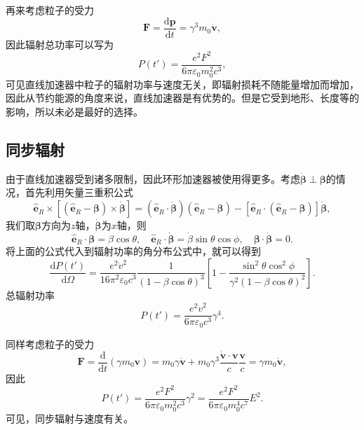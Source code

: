\documentclass[UTF8]{ctexbook}
\renewcommand{\d}{\mathrm{d}}
\renewcommand{\b}{\boldsymbol}
\numberwithin{equation}{chapter}
\begin{document}
	再来考虑粒子的受力
	\[\b{F}=\frac{\d \b{p}}{\d t}=\gamma^3 m_0 \dot{\b{v}},\]
	因此辐射总功率可以写为
	\[P(t')=\frac{e^2 F^2}{6\pi\varepsilon_0 m_0^2 c^3},\]
	可见直线加速器中粒子的辐射功率与速度无关，即辐射损耗不随能量增加而增加，因此从节约能源的角度来说，直线加速器是有优势的。但是它受到地形、长度等的影响，所以未必是最好的选择。
	
	\subsection{同步辐射}
	
	由于直线加速器受到诸多限制，因此环形加速器被使用得更多。考虑$\dot{\b{\beta}}\perp \b{\beta}$的情况，首先利用矢量三重积公式
	\[\hat{\b{e}}_R\times[(\hat{\b{e}}_R-\b{\beta})\times\dot{\b{\beta}}]=(\hat{\b{e}}_R\cdot\dot{\b{\beta}})(\hat{\b{e}}_R-\b{\beta})-[\hat{\b{e}}_R\cdot(\hat{\b{e}}_R-\b{\beta})]\dot{\b{\beta}},\]
	我们取$\b{\beta}$方向为$z$轴，$\dot{\b{\beta}}$为$x$轴，则
	\[\hat{\b{e}}_R\cdot\b{\beta}=\beta\cos\theta,\quad \hat{\b{e}}_R\cdot\dot{\b{\beta}}=\dot{\beta}\sin\theta\cos\phi,\quad \b{\beta}\cdot\dot{\b{\beta}}=0.\]
	将上面的公式代入到辐射功率的角分布公式中，就可以得到
	\[\frac{\d P(t')}{\d \Omega}=\frac{e^2 \dot{v}^2}{16\pi^2 \varepsilon_0 c^3}\frac{1}{(1-\beta\cos\theta)^3}\left[1-\frac{\sin^2\theta\cos^2\phi}{\gamma^2(1-\beta\cos\theta)^2}\right].\]
	总辐射功率
	\[P(t')=\frac{e^2\dot{v}^2}{6\pi\varepsilon_0c^3}\gamma^4.\]
	
	同样考虑粒子的受力
	\[\b{F}=\frac{\d}{\d t}(\gamma m_0\b{v})=m_0\gamma\dot{\b{v}}+m_0\gamma^3\frac{\dot{\b{v}}\cdot\b{v}}{c}\frac{\b{v}}{c}=\gamma m_0\dot{\b{v}},\]
	因此
	\[P(t')=\frac{e^2 F^2}{6\pi\varepsilon_0 m_0^2 c^3}\gamma^2 = \frac{e^2 F^2}{6\pi\varepsilon_0 m_0^4c^7}E^2.\]
	可见，同步辐射与速度有关。
	
\end{document}
